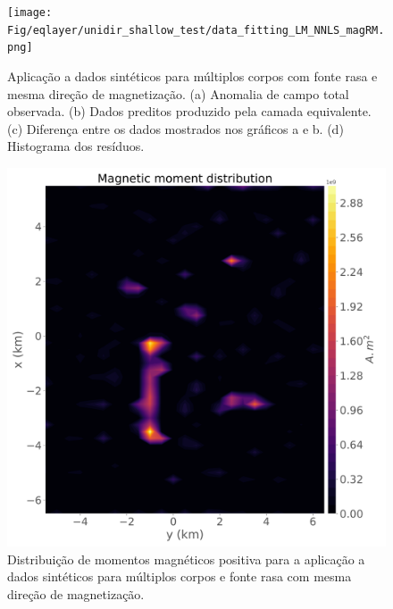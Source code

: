 \begin{figure}
	\centering
	\texttt{[image: Fig/eqlayer/unidir\_shallow\_test/data\_fitting\_LM\_NNLS\_magRM.png]}
	\caption{Aplicação a dados sintéticos para múltiplos corpos com fonte rasa e mesma direção de magnetização. (a) Anomalia de campo total observada. (b) Dados preditos produzido pela camada equivalente. (c) Diferença entre os dados mostrados nos gráficos a e b. (d) Histograma dos resíduos.}
	\label{fig:data_fitting_2}
\end{figure}

\begin{figure}
	\centering
	\includegraphics[width=.9\textwidth]{Fig/eqlayer/unidir_shallow_test/magnetic_moment_positive_LM_NNLS_magRM.png}
	\caption{Distribuição de momentos magnéticos positiva para a aplicação a dados sintéticos para múltiplos corpos e fonte rasa com mesma direção de magnetização.}
	\label{fig:dist_momentos_pos_2}
\end{figure}

